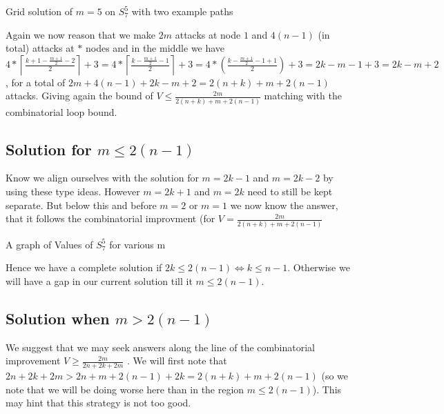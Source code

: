 \documentclass[a4paper,10pt]{article}
\newcommand{\ceil}[1]{\left \lceil #1 \right \rceil}
\theoremstyle{definition}
\theoremstyle{definition}
\theoremstyle{remark}
\theoremstyle{definition}
\begin{document}
\begin{myfigure}
\begin{center}
{
}
\end{center}
\caption{Grid solution of $m=5$ on $S_{7}^{5}$ with two example paths}
\end{myfigure}

Again we now reason that we make $2m$ attacks at node $1$ and $4(n-1)$ (in total) attacks at $*$ nodes and in the middle we have $4*\ceil{\frac{k+1-\frac{m+1}{2}-2}{2}}+3=4*\ceil{\frac{k-\frac{m+1}{2}-1}{2}}+3=4*(\frac{k-\frac{m+1}{2}-1+1}{2})+3=2k-m-1+3=2k-m+2$ , for a total of $2m+4(n-1)+2k-m+2=2(n+k)+m+2(n-1)$ attacks.
Giving again the bound of $V \leq \frac{2m}{2(n+k)+m+2(n-1)}$ matching with the combinatorial loop bound.

\subsection{Solution for $m \leq 2(n-1)$}
Know we align ourselves with the solution for $m=2k-1$ and $m=2k-2$ by using these type ideas. However $m=2k+1$ and $m=2k$ need to still be kept separate. But below this and before $m=2$ or $m=1$ we now know the answer, that it follows the combinatorial improvment (for $V=\frac{2m}{2(n+k)+m+2(n-1)}$

\begin{myfigure}

\caption{A graph of Values of $S_{7}^{5}$ for various m}
\end{myfigure}

Hence we have a complete solution if $2k \leq 2(n-1) \iff k \leq n-1$. Otherwise we will have a gap in our current solution till it $m \leq 2(n-1)$. 


\subsection{Solution when $m > 2(n-1)$}
We suggest that we may seek answers along the line of the combinatorial improvement $V \geq \frac{2m}{2n+2k+2m}$ . We will first note that $2n+2k+2m > 2n+m+2(n-1)+2k=2(n+k)+m+2(n-1)$ (so we note that we will be doing worse here than in the region $m \leq 2(n-1)$). This may hint that this strategy is not too good.
\end{document}
